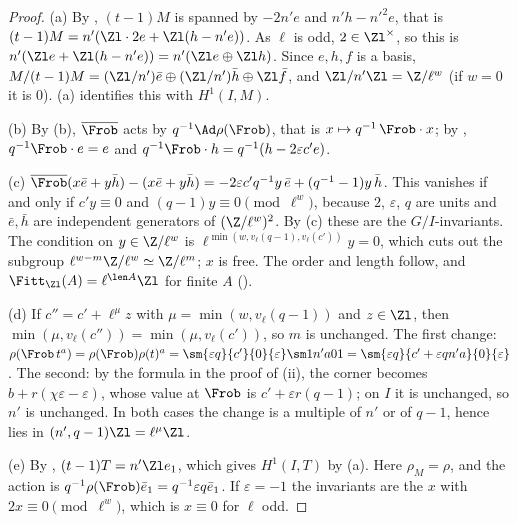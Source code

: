 \begin{proof}
(a) By , $(t-1)M$ is spanned by $-2n'e$ and $n'h-n'^2e$, that is $(t-1)M=n'(\Zl\cdot2e+\Zl(h-n'e))$. As $\ell$ is odd, $2\in\Zl^\times$, so this
is $n'(\Zl e+\Zl(h-n'e))=n'(\Zl e\oplus\Zl h)$. Since $e,h,f$ is a basis, $M/(t-1)M=(\Zl/n')\bar e\oplus(\Zl/n')\bar h\oplus\Zl\bar f$, and $\Zl/n'\Zl=\Z/\ell^w$ (if $w=0$ it is $0$).
(a) identifies this with $H^1(I,M)$.

(b) By (b), $\overline\Frob$ acts by $q^{-1}\Ad\rho(\Frob)$, that is $x\mapsto q^{-1}\,\Frob\cdot x$; by , $q^{-1}\Frob\cdot e=e$ and $q^{-1}\Frob\cdot h=q^{-1}(h-2\varepsilon c'e)$.

(c) $\overline\Frob(x\bar e+y\bar h)-(x\bar e+y\bar h)=-2\varepsilon c'q^{-1}y\,\bar e+(q^{-1}-1)y\,\bar h$. This vanishes if and only if $c'y\equiv0$ and $(q-1)y\equiv0\pmod{\ell^w}$, because
$2$, $\varepsilon$, $q$ are units and $\bar e,\bar h$ are independent generators of $(\Z/\ell^w)^2$. By (c) these are the $G/I$-invariants. The
condition on $y\in\Z/\ell^w$ is $\ell^{\min(w,v_\ell(q-1),v_\ell(c'))}y=0$, which cuts out the subgroup $\ell^{w-m}\Z/\ell^w\simeq\Z/\ell^m$; $x$ is free. The order and length follow,
and $\Fitt_{\Zl}(A)=\ell^{\len A}\Zl$ for finite $A$ ().

(d) If $c''=c'+\ell^\mu z$ with $\mu=\min(w,v_\ell(q-1))$ and $z\in\Zl$, then $\min(\mu,v_\ell(c''))=\min(\mu,v_\ell(c'))$, so $m$ is unchanged. The first change:
$\rho(\Frob\,t^a)=\rho(\Frob)\rho(t)^a=\sm{\varepsilon q}{c'}{0}{\varepsilon}\sm1{n'a}01=\sm{\varepsilon q}{c'+\varepsilon qn'a}{0}{\varepsilon}$. The second: by the formula in the proof of
(ii), the corner becomes $b+r(\chi\varepsilon-\varepsilon)$, whose value at $\Frob$ is $c'+\varepsilon r(q-1)$; on $I$ it is unchanged, so $n'$ is unchanged.
In both cases the change is a multiple of $n'$ or of $q-1$, hence lies in $(n',q-1)\Zl=\ell^\mu\Zl$.

(e) By , $(t-1)T=n'\Zl e_1$, which gives $H^1(I,T)$ by (a). Here $\rho_M=\rho$, and the action is $q^{-1}\rho(\Frob)\bar e_1=q^{-1}\varepsilon q\bar e_1$.
If $\varepsilon=-1$ the invariants are the $x$ with $2x\equiv0\pmod{\ell^w}$, which is $x\equiv0$ for $\ell$ odd.
\end{proof}

